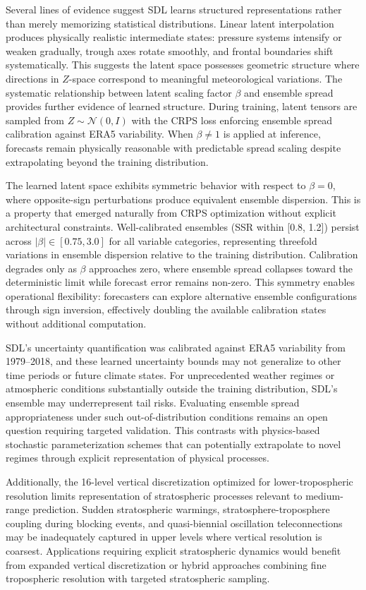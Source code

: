 \documentclass[11pt]{article}
\begin{document}
Several lines of evidence suggest SDL learns structured representations rather than merely memorizing statistical distributions. Linear latent interpolation produces physically realistic intermediate states: pressure systems intensify or weaken gradually, trough axes rotate smoothly, and frontal boundaries shift systematically. This suggests the latent space possesses geometric structure where directions in $Z$-space correspond to meaningful meteorological variations. The systematic relationship between latent scaling factor $\beta$ and ensemble spread provides further evidence of learned structure. During training, latent tensors are sampled from $Z \sim \mathcal{N}(0, I)$ with the CRPS loss enforcing ensemble spread calibration against ERA5 variability. When $\beta \neq 1$ is applied at inference, forecasts remain physically reasonable with predictable spread scaling despite extrapolating beyond the training distribution.

The learned latent space exhibits symmetric behavior with respect to $\beta = 0$, where opposite-sign perturbations produce equivalent ensemble dispersion. This is a property that emerged naturally from CRPS optimization without explicit architectural constraints. Well-calibrated ensembles (SSR within [0.8, 1.2]) persist across $|\beta| \in [0.75, 3.0]$ for all variable categories, representing threefold variations in ensemble dispersion relative to the training distribution. Calibration degrades only as $\beta$ approaches zero, where ensemble spread collapses toward the deterministic limit while forecast error remains non-zero. This symmetry enables operational flexibility: forecasters can explore alternative ensemble configurations through sign inversion, effectively doubling the available calibration states without additional computation.

SDL's uncertainty quantification was calibrated against ERA5 variability from 1979–2018, and these learned uncertainty bounds may not generalize to other time periods or future climate states. For unprecedented weather regimes or atmospheric conditions substantially outside the training distribution, SDL's ensemble may underrepresent tail risks. Evaluating ensemble spread appropriateness under such out-of-distribution conditions remains an open question requiring targeted validation. This contrasts with physics-based stochastic parameterization schemes that can potentially extrapolate to novel regimes through explicit representation of physical processes.

Additionally, the 16-level vertical discretization optimized for lower-tropospheric resolution limits representation of stratospheric processes relevant to medium-range prediction. Sudden stratospheric warmings, stratosphere-troposphere coupling during blocking events, and quasi-biennial oscillation teleconnections may be inadequately captured in upper levels where vertical resolution is coarsest. Applications requiring explicit stratospheric dynamics would benefit from expanded vertical discretization or hybrid approaches combining fine tropospheric resolution with targeted stratospheric sampling.
\end{document}
